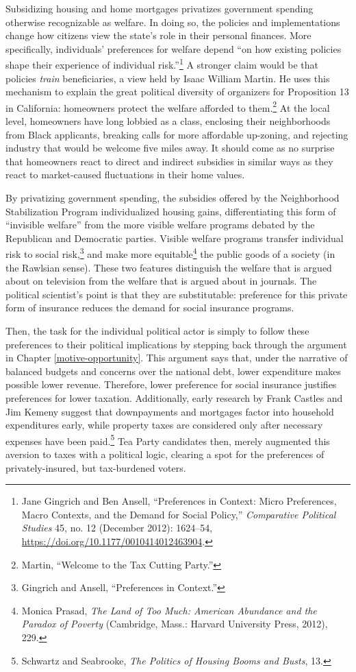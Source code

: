\documentclass[12pt,oneside]{psthesis}
\begin{document}
Subsidizing housing and home mortgages privatizes government spending otherwise recognizable as welfare.
In doing so, the policies and implementations change how citizens view the state's role in their personal finances.
More specifically, individuals' preferences for welfare depend ``on how existing policies shape their experience of individual risk.''\footnote{Jane Gingrich and Ben Ansell, ``Preferences in Context: Micro Preferences, Macro Contexts, and the Demand for Social Policy,'' \emph{Comparative Political Studies} 45, no. 12 (December 2012): 1624--54, \url{https://doi.org/10.1177/0010414012463904}.}
A stronger claim would be that policies \emph{train} beneficiaries, a view held by Isaac William Martin.
He uses this mechanism to explain the great political diversity of organizers for Proposition 13 in California: homeowners protect the welfare afforded to them.\footnote{Martin, ``Welcome to the Tax Cutting Party.''}
At the local level, homeowners have long lobbied as a class, enclosing their neighborhoods from Black applicants, breaking calls for more affordable up-zoning, and rejecting industry that would be welcome five miles away.
It should come as no surprise that homeowners react to direct and indirect subsidies in similar ways as they react to market-caused fluctuations in their home values.

By privatizing government spending, the subsidies offered by the Neighborhood Stabilization Program individualized housing gains, differentiating this form of ``invisible welfare'' from the more visible welfare programs debated by the Republican and Democratic parties.
Visible welfare programs transfer individual risk to social risk,\footnote{Gingrich and Ansell, ``Preferences in Context.''} and make more equitable\footnote{Monica Prasad, \emph{The Land of Too Much: American Abundance and the Paradox of Poverty} (Cambridge, Mass.: Harvard University Press, 2012), 229.} the public goods of a society (in the Rawlsian sense).
These two features distinguish the welfare that is argued about on television from the welfare that is argued about in journals.
The political scientist's point is that they are substitutable: preference for this private form of insurance reduces the demand for social insurance programs.

Then, the task for the individual political actor is simply to follow these preferences to their political implications by stepping back through the argument in Chapter \ref{motive-opportunity}.
This argument says that, under the narrative of balanced budgets and concerns over the national debt, lower expenditure makes possible lower revenue.
Therefore, lower preference for social insurance justifies preferences for lower taxation.
Additionally, early research by Frank Castles and Jim Kemeny suggest that downpayments and mortgages factor into household expenditures early, while property taxes are considered only after necessary expenses have been paid.\footnote{Schwartz and Seabrooke, \emph{The Politics of Housing Booms and Busts}, 13.}
Tea Party candidates then, merely augmented this aversion to taxes with a political logic, clearing a spot for the preferences of privately-insured, but tax-burdened voters.
\end{document}
